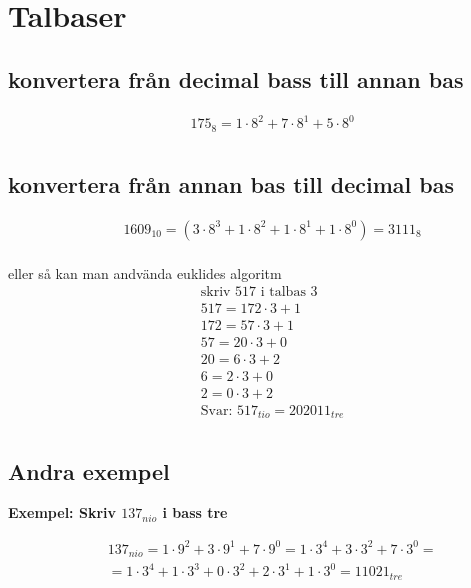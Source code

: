 \newpage

\section{Talbaser}
\subsection{konvertera från decimal bass till annan bas}
\begin{align*}
  &\quad  175_8 = 1 \cdot 8^2 + 7 \cdot 8^1 + 5 \cdot 8^0 \\
\end{align*}

\subsection{konvertera från annan bas till decimal bas}
\begin{align*}
  &\quad  1609_{10} = (3 \cdot 8^3 + 1 \cdot 8^2 + 1 \cdot 8^1 + 1 \cdot 8^0) = 3111_8 \\
\end{align*}

eller så kan man andvända euklides algoritm 
\begin{align*}
  &\quad  \text{skriv 517 i talbas 3} \\
  &\quad  517 = 172 \cdot 3 + 1 \\
  &\quad  172 =  57 \cdot 3 + 1 \\
  &\quad   57 =  20 \cdot 3 + 0 \\
  &\quad   20 =   6 \cdot 3 + 2 \\
  &\quad    6 =   2 \cdot 3 + 0 \\
  &\quad    2 =   0 \cdot 3 + 2 \\
  &\quad  \text{Svar: } 517_{tio} = 202011_{tre} \\
\end{align*}

\subsection{Andra exempel}
\textbf{Exempel: Skriv $137_{nio}$  i bass tre}\par
\begin{align*}
  &\quad  137_{nio} = 1 \cdot 9^2 + 3 \cdot 9^1 + 7 \cdot 9^0 = 1 \cdot 3^4 + 3 \cdot 3^2 + 7 \cdot 3^0 =  \\
  &\quad  = 1 \cdot 3^4 + 1 \cdot 3^3 + 0 \cdot 3^2 + 2 \cdot 3^1 + 1 \cdot 3^0 = 11021_{tre}
\end{align*}


